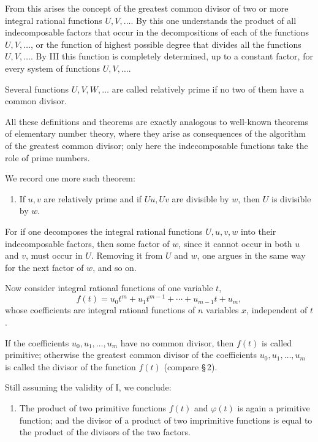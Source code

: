 \documentclass[11pt]{article}
\begin{document}
From this arises the concept of the greatest common divisor of two or more integral rational functions $U,V,\ldots$. By this one understands the product of all indecomposable factors that occur in the decompositions of each of the functions $U,V,\ldots$, or the function of highest possible degree that divides all the functions $U,V,\ldots$. By III this function is completely determined, up to a constant factor, for every system of functions $U,V,\ldots$.

Several functions $U,V,W,\ldots$ are called relatively prime if no two of them have a common divisor.

All these definitions and theorems are exactly analogous to well-known theorems of elementary number theory, where they arise as consequences of the algorithm of the greatest common divisor; only here the indecomposable functions take the role of prime numbers.

We record one more such theorem:

\begin{enumerate}[label=\Roman*.,leftmargin=2.4em,start=4]
\item If $u,v$ are relatively prime and if $Uu,Uv$ are divisible by $w$, then $U$ is divisible by $w$.
\end{enumerate}

For if one decomposes the integral rational functions $U,u,v,w$ into their indecomposable factors, then some factor of $w$, since it cannot occur in both $u$ and $v$, must occur in $U$. Removing it from $U$ and $w$, one argues in the same way for the next factor of $w$, and so on.

Now consider integral rational functions of one variable $t$,
\[
f(t)=u_0t^m+u_1t^{m-1}+\cdots+u_{m-1}t+u_m,
\]
whose coefficients are integral rational functions of $n$ variables $x$, independent of $t$.

If the coefficients $u_0,u_1,\ldots,u_m$ have no common divisor, then $f(t)$ is called primitive; otherwise the greatest common divisor of the coefficients $u_0,u_1,\ldots,u_m$ is called the divisor of the function $f(t)$ (compare \S\,2).

Still assuming the validity of I, we conclude:

\begin{enumerate}[label=\Roman*.,leftmargin=2.4em,start=5]
\item The product of two primitive functions $f(t)$ and $\varphi(t)$ is again a primitive function; and the divisor of a product of two imprimitive functions is equal to the product of the divisors of the two factors.
\end{enumerate}
\end{document}
